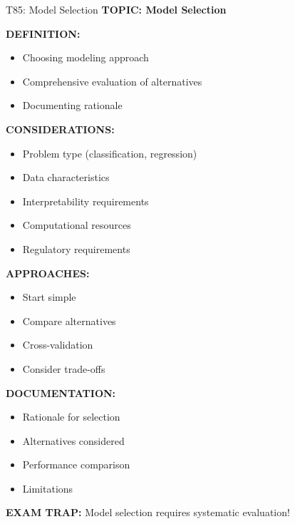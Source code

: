 \documentclass[8pt]{beamer}
\begin{document}
	\begin{frame}{T85: Model Selection}
		\fontsize{6.5}{7.5}\selectfont
		\textbf{TOPIC: Model Selection}
		
		\vspace{0.1cm}
		\textbf{DEFINITION:}
		\begin{itemize}
			\item Choosing modeling approach
			\item Comprehensive evaluation of alternatives
			\item Documenting rationale
		\end{itemize}
		
		\vspace{0.1cm}
		\textbf{CONSIDERATIONS:}
		\begin{itemize}
			\item Problem type (classification, regression)
			\item Data characteristics
			\item Interpretability requirements
			\item Computational resources
			\item Regulatory requirements
		\end{itemize}
		
		\vspace{0.1cm}
		\textbf{APPROACHES:}
		\begin{itemize}
			\item Start simple
			\item Compare alternatives
			\item Cross-validation
			\item Consider trade-offs
		\end{itemize}
		
		\vspace{0.1cm}
		\textbf{DOCUMENTATION:}
		\begin{itemize}
			\item Rationale for selection
			\item Alternatives considered
			\item Performance comparison
			\item Limitations
		\end{itemize}
		
		\textcolor{myred}{\textbf{EXAM TRAP:}} Model selection requires \textcolor{myblue}{systematic evaluation}!
	\end{frame}
	
\end{document}
